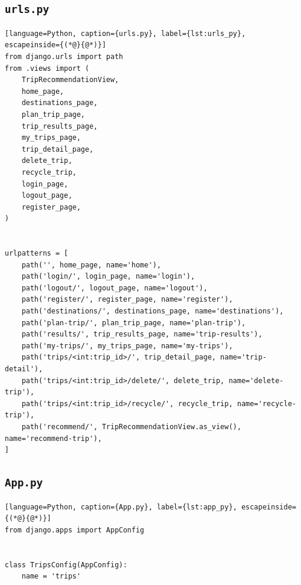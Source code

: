\subsection{\texttt{urls.py}}
\begin{lstlisting}[language=Python, caption={urls.py}, label={lst:urls_py}, escapeinside={(*@}{@*)}]
from django.urls import path
from .views import (
    TripRecommendationView,
    home_page,
    destinations_page,
    plan_trip_page,
    trip_results_page,
    my_trips_page,
    trip_detail_page,
    delete_trip,
    recycle_trip,
    login_page,
    logout_page,
    register_page,
)


urlpatterns = [
    path('', home_page, name='home'),
    path('login/', login_page, name='login'),
    path('logout/', logout_page, name='logout'),
    path('register/', register_page, name='register'),
    path('destinations/', destinations_page, name='destinations'),
    path('plan-trip/', plan_trip_page, name='plan-trip'),
    path('results/', trip_results_page, name='trip-results'),
    path('my-trips/', my_trips_page, name='my-trips'),
    path('trips/<int:trip_id>/', trip_detail_page, name='trip-detail'),
    path('trips/<int:trip_id>/delete/', delete_trip, name='delete-trip'),
    path('trips/<int:trip_id>/recycle/', recycle_trip, name='recycle-trip'),
    path('recommend/', TripRecommendationView.as_view(), name='recommend-trip'),
]
\end{lstlisting}


\subsection{\texttt{App.py}}
\begin{lstlisting}[language=Python, caption={App.py}, label={lst:app_py}, escapeinside={(*@}{@*)}]
from django.apps import AppConfig


class TripsConfig(AppConfig):
    name = 'trips'
\end{lstlisting}


